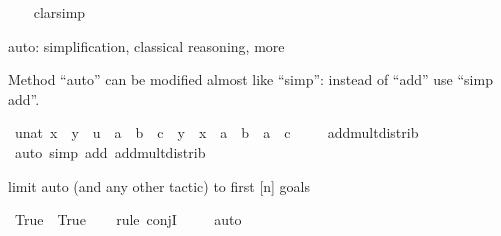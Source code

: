 \begin{isabellebody}
%
\isadelimproof
\ \ %
\endisadelimproof
%
\isatagproof
{}\isamarkupfalse%
\ clarsimp\isanewline
\ \ \isamarkupfalse%
%
\endisatagproof
{\isafoldproof}%
%
\isadelimproof
%
\endisadelimproof
%
\begin{isamarkuptext}%
auto: simplification, classical reasoning, more%
\end{isamarkuptext}\isamarkuptrue%
%
\begin{isamarkuptext}%
Method ``auto'' can be modified almost like ``simp'':
  instead of ``add'' use ``simp add''.%
\end{isamarkuptext}\isamarkuptrue%
\isamarkupfalse%
\ {\isachardoublequoteopen}{\isacharparenleft}{\kern0pt}{\isasymexists}u{\isacharcolon}{\kern0pt}{\isacharcolon}{\kern0pt}nat{\isachardot}{\kern0pt}\ x\ {\isacharequal}{\kern0pt}\ y\ {\isacharplus}{\kern0pt}\ u{\isacharparenright}{\kern0pt}\ {\isasymlongrightarrow}\ a\ {\isacharasterisk}{\kern0pt}\ {\isacharparenleft}{\kern0pt}b\ {\isacharplus}{\kern0pt}\ c{\isacharparenright}{\kern0pt}\ {\isacharplus}{\kern0pt}\ y\ {\isasymle}\ x\ {\isacharplus}{\kern0pt}\ a\ {\isacharasterisk}{\kern0pt}\ b\ {\isacharplus}{\kern0pt}\ a\ {\isacharasterisk}{\kern0pt}\ c{\isachardoublequoteclose}\ \isanewline
\ \ \isamarkupfalse%
\ add{\isacharunderscore}{\kern0pt}mult{\isacharunderscore}{\kern0pt}distrib{}\isanewline
%
\isadelimproof
\ \ %
\endisadelimproof
%
\isatagproof
{}\isamarkupfalse%
\ {\isacharparenleft}{\kern0pt}auto\ simp\ add{\isacharcolon}{\kern0pt}\ add{\isacharunderscore}{\kern0pt}mult{\isacharunderscore}{\kern0pt}distrib{}{\isacharparenright}{\kern0pt}\isanewline
\ \ \isamarkupfalse%
%
\endisatagproof
{\isafoldproof}%
%
\isadelimproof
%
\endisadelimproof
%
\begin{isamarkuptext}%
limit auto (and any other tactic) to first [n] goals%
\end{isamarkuptext}\isamarkuptrue%
\isamarkupfalse%
\ {\isachardoublequoteopen}{\isacharparenleft}{\kern0pt}True\ {\isasymand}\ True{\isacharparenright}{\kern0pt}{\isachardoublequoteclose}\isanewline
%
\isadelimproof
\ \ %
\endisadelimproof
%
\isatagproof
{}\isamarkupfalse%
\ {\isacharparenleft}{\kern0pt}rule\ conjI{\isacharparenright}{\kern0pt}\isanewline
\ \ \ \isamarkupfalse%
\ {\isacharparenleft}{\kern0pt}auto{\isacharparenright}{\kern0pt}{\isacharbrackleft}{\kern0pt}{}{\isacharbrackright}{\kern0pt}\isanewline
\ \ \isamarkupfalse%

\end{isabellebody}
